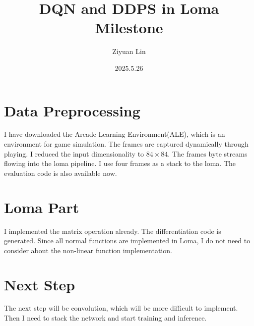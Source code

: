\documentclass{article}
\title{DQN and DDPS in Loma Milestone}
\author{Ziyuan Lin}
\date{2025.5.26}
\begin{document}
\maketitle
\section{Data Preprocessing}
I have downloaded the Arcade Learning Environment(ALE), which is an environment for game simulation. The frames are captured dynamically through playing.
I reduced the input dimensionality to $84 \times 84$. The frames byte streams flowing into the loma pipeline. I use four frames as a stack to the loma.
The evaluation code is also available now.
\section{Loma Part}
I implemented the matrix operation already. The differentiation code is generated. Since all normal functions are implemented in Loma, I do not need to consider about the
non-linear function implementation. 
\section{Next Step}
The next step will be convolution, which will be more difficult to implement. Then I need to stack the network and start training and inference.
\end{document}

